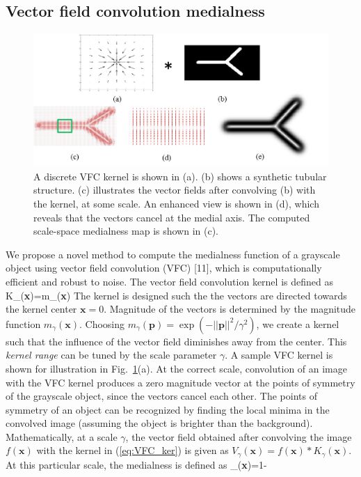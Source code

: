 \subsection{Vector field convolution medialness}
\begin{figure}[thb]
\centering
\includegraphics[width=1\linewidth]{./images/VFC/medialness}	
\caption[VFC medialness]{A discrete VFC kernel is shown in (a). (b) shows a synthetic tubular structure. (c) illustrates the vector fields after convolving (b) with the kernel, at some scale. An enhanced view is shown in (d), which reveals that the vectors cancel at the medial axis. The computed scale-space medialness map is shown in (c).}
\label{fig:medialness}
\end{figure}
\noindent We propose a novel method to compute the medialness function of a grayscale object using vector field convolution (VFC) [11], which is computationally efficient and robust to noise. The vector field convolution kernel is defined as
\bea
K_{\gamma}(\textbf{x})=m_\gamma(\textbf{x})
\label{eq:VFC_ker}
\eea
The kernel is designed such the the vectors are directed towards the kernel center $\textbf{x}=0$. Magnitude of the vectors is determined by the magnitude function $m_\gamma(\textbf{x})$. Choosing $m_\gamma(\textbf{p})=\exp(-||\textbf{p}||^{2}/\gamma^{2})$, we create a kernel such that the influence of the vector field diminishes away from the center. This \emph{kernel range} can be tuned by the scale parameter $\gamma$. A sample VFC kernel is shown for illustration in Fig.~\ref{fig:medialness}(a). At the correct scale, convolution of an image with the VFC kernel produces a zero magnitude vector at the points of symmetry of the grayscale object, since the vectors cancel each other. The points of symmetry of an object can be recognized by finding the local minima in the convolved image (assuming the object is brighter than the background). Mathematically, at a scale $\gamma$, the vector field obtained after convolving the image $f(\textbf{x})$ with the kernel in (\ref{eq:VFC_ker}) is given as $V_{\gamma}(\textbf{x})= f(\textbf{x})*K_{\gamma}(\textbf{x})$. At this particular scale, the medialness is defined as
\bea
\mu_{\gamma}(\textbf{x})=1-
\label{eq:med_scale}
\eea

